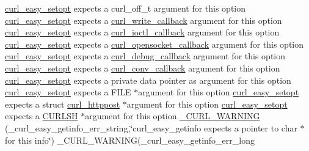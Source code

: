 \begin{DoxyCompactItemize}
\hyperlink{easy_8h_a7b171739b7bb728b3b58b2e6ec454aa0}{curl\+\_\+easy\+\_\+setopt} expects a curl\+\_\+off\+\_\+t argument for this option \hyperlink{easy_8h_a7b171739b7bb728b3b58b2e6ec454aa0}{curl\+\_\+easy\+\_\+setopt} expects a \hyperlink{curl_8h_ad65e62dcde45b356254b0f25f38dd802}{curl\+\_\+write\+\_\+callback} argument for this option \hyperlink{easy_8h_a7b171739b7bb728b3b58b2e6ec454aa0}{curl\+\_\+easy\+\_\+setopt} expects a \hyperlink{curl_8h_ae0524f6ec082005e39eb275c71c59a3b}{curl\+\_\+ioctl\+\_\+callback} argument for this option \hyperlink{easy_8h_a7b171739b7bb728b3b58b2e6ec454aa0}{curl\+\_\+easy\+\_\+setopt} expects a \hyperlink{curl_8h_a1b8b8f3e1a4e538a6bb1dd83a3388547}{curl\+\_\+opensocket\+\_\+callback} argument for this option \hyperlink{easy_8h_a7b171739b7bb728b3b58b2e6ec454aa0}{curl\+\_\+easy\+\_\+setopt} expects a \hyperlink{curl_8h_a50147c55283ee1fa3322b0d5aff2326c}{curl\+\_\+debug\+\_\+callback} argument for this option \hyperlink{easy_8h_a7b171739b7bb728b3b58b2e6ec454aa0}{curl\+\_\+easy\+\_\+setopt} expects a \hyperlink{curl_8h_acb230bf6dbf7bcb6e4e8740ea42ca3b3}{curl\+\_\+conv\+\_\+callback} argument for this option \hyperlink{easy_8h_a7b171739b7bb728b3b58b2e6ec454aa0}{curl\+\_\+easy\+\_\+setopt} expects a private data pointer as argument for this option \hyperlink{easy_8h_a7b171739b7bb728b3b58b2e6ec454aa0}{curl\+\_\+easy\+\_\+setopt} expects a F\+I\+L\+E $\ast$argument for this option \hyperlink{easy_8h_a7b171739b7bb728b3b58b2e6ec454aa0}{curl\+\_\+easy\+\_\+setopt} expects a struct \hyperlink{structcurl__httppost}{curl\+\_\+httppost} $\ast$argument for this option \hyperlink{easy_8h_a7b171739b7bb728b3b58b2e6ec454aa0}{curl\+\_\+easy\+\_\+setopt} expects a \hyperlink{curl_8h_a746d4e7ba89fe28a008e91cffb343ef0}{C\+U\+R\+L\+S\+H} $\ast$argument for this option \hyperlink{typecheck-gcc_8h_a52cfaffda1358b4ef703c9e692228170}{\+\_\+\+C\+U\+R\+L\+\_\+\+W\+A\+R\+N\+I\+N\+G} (\+\_\+curl\+\_\+easy\+\_\+getinfo\+\_\+err\+\_\+string,\char`\"{}curl\+\_\+easy\+\_\+getinfo expects a pointer to char $\ast$ for this info\char`\"{}) \+\_\+\+C\+U\+R\+L\+\_\+\+W\+A\+R\+N\+I\+N\+G(\+\_\+curl\+\_\+easy\+\_\+getinfo\+\_\+err\+\_\+long
\item 

\end{DoxyCompactItemize}

